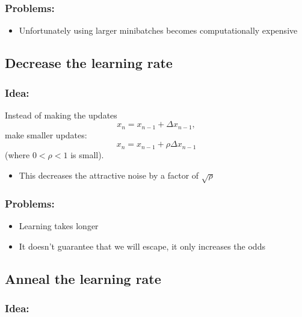 \documentclass[11pt]{article}
\providecommand{\tightlist}{%
      \setlength{\itemsep}{0pt}\setlength{\parskip}{0pt}}
\begin{document}
\hypertarget{problems}{%
\subsubsection{Problems:}\label{problems}}

\begin{itemize}
\tightlist
\item
  Unfortunately using larger minibatches becomes computationally
  expensive
\end{itemize}

    \hypertarget{decrease-the-learning-rate}{%
\subsection{Decrease the learning
rate}\label{decrease-the-learning-rate}}

\hypertarget{idea}{%
\subsubsection{Idea:}\label{idea}}

Instead of making the updates \[x_n = x_{n-1} +\Delta x_{n-1},\] make
smaller updates: \[x_n = x_{n-1} +\rho \Delta x_{n-1}\] (where
\(0<\rho<1\) is small).

\begin{itemize}
\tightlist
\item
  This decreases the attractive noise by a factor of \(\sqrt{\rho}\)
\end{itemize}

\hypertarget{problems}{%
\subsubsection{Problems:}\label{problems}}

\begin{itemize}
\tightlist
\item
  Learning takes longer
\item
  It doesn't guarantee that we will escape, it only increases the odds
\end{itemize}

    \hypertarget{anneal-the-learning-rate}{%
\subsection{Anneal the learning rate}\label{anneal-the-learning-rate}}

\hypertarget{idea}{%
\subsubsection{Idea:}\label{idea}}
\end{document}
